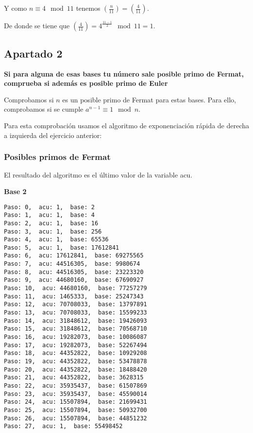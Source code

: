 \documentclass[a4paper]{article}
\begin{document}
Y como $n \equiv 4 \mod 11$ tenemos $\left( \frac{n}{11} \right)=\left( \frac{4}{11} \right)$.

De donde se tiene que $\left( \frac{4}{11} \right)=4^{\frac{11-1}{2}}\mod 11=1$.



\subsection{Apartado 2}
\textbf{Si para alguna de esas bases tu número sale posible primo de Fermat, comprueba si además es posible primo de Euler}

Comprobamos si $n$ es un posible primo de Fermat para estas bases. Para ello, comprobamos si se cumple $a^{n-1}\equiv 1 \mod n$.

Para esta comprobación usamos el algoritmo de exponenciación rápida de derecha a izquierda del ejercicio anterior:

\subsubsection{Posibles primos de Fermat}

El resultado del algoritmo es el último valor de la variable acu.

\textbf{Base 2}

\begin{verbatim}
Paso: 0,  acu: 1,  base: 2  
Paso: 1,  acu: 1,  base: 4  
Paso: 2,  acu: 1,  base: 16  
Paso: 3,  acu: 1,  base: 256  
Paso: 4,  acu: 1,  base: 65536  
Paso: 5,  acu: 1,  base: 17612841  
Paso: 6,  acu: 17612841,  base: 69275565  
Paso: 7,  acu: 44516305,  base: 9980674  
Paso: 8,  acu: 44516305,  base: 23223320  
Paso: 9,  acu: 44680160,  base: 67690927  
Paso: 10,  acu: 44680160,  base: 77257279  
Paso: 11,  acu: 1465333,  base: 25247343  
Paso: 12,  acu: 70708033,  base: 13797891  
Paso: 13,  acu: 70708033,  base: 15599233  
Paso: 14,  acu: 31848612,  base: 19426093  
Paso: 15,  acu: 31848612,  base: 70568710  
Paso: 16,  acu: 19282073,  base: 10086087  
Paso: 17,  acu: 19282073,  base: 52267494  
Paso: 18,  acu: 44352822,  base: 10929208  
Paso: 19,  acu: 44352822,  base: 53478878  
Paso: 20,  acu: 44352822,  base: 18488420  
Paso: 21,  acu: 44352822,  base: 3628315  
Paso: 22,  acu: 35935437,  base: 61507869  
Paso: 23,  acu: 35935437,  base: 45590014  
Paso: 24,  acu: 15507894,  base: 21699431  
Paso: 25,  acu: 15507894,  base: 50932700  
Paso: 26,  acu: 15507894,  base: 44851232  
Paso: 27,  acu: 1,  base: 55498452  
\end{verbatim}
\end{document}
